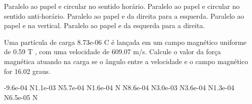 \documentclass[12pt, addpoints]{exam}
\begin{document}
\begin{questions}
\begin{multicols*}{2}
\begin{choices}
\choice Paralelo ao papel e circular no sentido horário. 
\choice Paralelo ao papel e circular no sentido anti-horário. 
\choice Paralelo ao papel e da direita para a esquerda. 
\choice Paralelo ao papel e na vertical. 
\choice Paralelo ao papel e da esquerda para a direita. 
\end{choices}
\question Uma partícula de carga 8.73e-06 C é lançada em um campo magnético uniforme de    0.59 T , com uma velocidade de 609.07 m/s. Calcule o valor da força magnética atuando na carga se o ângulo entre a velocidade e o campo magnético for   16.02 graus.

\begin{oneparchoices}
\choice -9.6e-04 N\choice 1.1e-03 N\choice 5.7e-04 N\choice 1.6e-04 N N\choice 8.6e-04 N\choice 3.0e-03 N\choice 3.6e-04 N\choice 1.3e-04 N\choice 6.5e-05 N
\end{oneparchoices}\end{multicols*}
\end{questions}
\newpage
\end{document}
